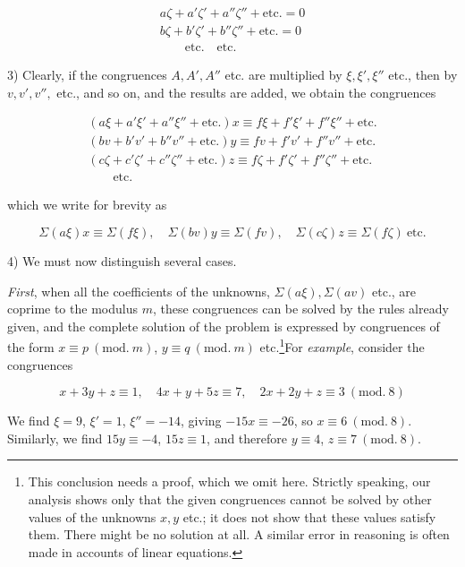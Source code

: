 \[\begin{array}{l}
a\zeta+a'\zeta'+a''\zeta''+\mathrm{etc.}=0\\
b\zeta+b'\zeta'+b''\zeta''+\mathrm{etc.}=0\\
\qquad\mathrm{etc.}\quad\mathrm{etc.}
\end{array}\]

3) Clearly, if the congruences $A,A',A''$ etc. are multiplied by $\xi,\xi',\xi''$ etc., then by $v,v',v'',$ etc., and so on, and the results are added, we obtain the congruences

\[
\begin{array}{l}(a\xi+a'\xi'+a''\xi''+\mathrm{etc.})x\equiv f\xi+f'\xi'+f''\xi''+\mathrm{etc.}\\(bv+b'v'+b''v''+\mathrm{etc.})y\equiv fv+f'v'+f''v''+\mathrm{etc.}\\(c\zeta+c'\zeta'+c''\zeta''+\mathrm{etc.})z\equiv f\zeta+f'\zeta'+f''\zeta''+\mathrm{etc.}\\\qquad\mathrm{etc.}\end{array}
\]

which we write for brevity as

\[
\Sigma(a\xi)x\equiv\Sigma(f\xi),\quad\Sigma(bv)y\equiv\Sigma(fv),\quad\Sigma(c\zeta)z\equiv\Sigma(f\zeta)\ \mathrm{etc.}
\]

4) We must now distinguish several cases.

\emph{First}, when all the coefficients of the unknowns, $\Sigma(a\xi),\Sigma(av)$ etc., are coprime to the modulus $m$, these congruences can be solved by the rules already given, and the complete solution of the problem is expressed by congruences of the form $x\equiv p\ (\mathrm{mod.}\ m)$, $y\equiv q\ (\mathrm{mod.}\ m)$ etc.\begingroup\renewcommand{\thefootnote}{*)}\footnote{This conclusion needs a proof, which we omit here. Strictly speaking, our analysis shows only that the given congruences cannot be solved by other values of the unknowns $x,y$ etc.; it does not show that these values satisfy them. There might be no solution at all. A similar error in reasoning is often made in accounts of linear equations.}\endgroup For \emph{example}, consider the congruences

\[x+3y+z\equiv1,\quad4x+y+5z\equiv7,\quad2x+2y+z\equiv3\ (\mathrm{mod.}\ 8)\]

We find $\xi=9$, $\xi'=1$, $\xi''=-14$, giving $-15x\equiv-26$, so $x\equiv6\ (\mathrm{mod.}\ 8)$. Similarly, we find $15y\equiv-4$, $15z\equiv1$, and therefore $y\equiv4$, $z\equiv7\ (\mathrm{mod.}\ 8)$.

